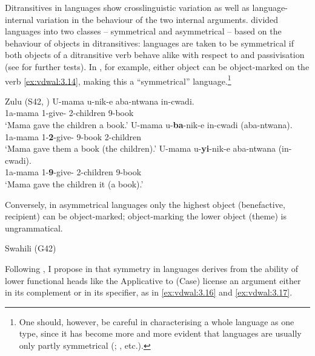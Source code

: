 \documentclass[output=paper]{langsci/langscibook}
\begin{document}
Ditransitives in  languages show crosslinguistic variation as well as
lan\-guage-internal variation in the behaviour of the two internal arguments.
\citet{BresMosh1990} divided  languages into two classes -- symmetrical
and asymmetrical -- based on the behaviour of objects in ditransitives:
languages are taken to be symmetrical if both objects of a ditransitive
verb
behave alike with respect to  and passivisation (see
\citealt{Ngonyani1996,Buell2005} for further tests). In , for
example, either object can be object-marked on the verb \eqref{ex:vdwal:3.14},
making this a \enquote{symmetrical} language.\footnote{One should, however, be careful
    in characterising a whole language as one type, since it has become more
    and more evident that languages are usually only partly symmetrical
    (\citealt{Schadeberg1995,Rugemalira1991,Thwala2006,Ngonyani1996,NgonyaniGithinji2006,Riedel2009,Baker1988,AlsinaMchombo1993,Simango1995,ZellerNgoboka2006,Jerro2015};
, etc.).}

\ea\label{ex:vdwal:3.14}Zulu (S42, \citealt[11]{Adams2010})
	\ea
	\gll	 U-mama  u-nik-e  aba-ntwana   in-cwadi.\\
	    1a-mama  1\Sm{}{}-give-\Pfv{}  2-children  9-book\\
	\glt    ‘Mama gave the children a book.’
	\ex
	\gll	 U-mama  u-\textbf{ba}{}-nik-e  in-cwadi  (aba-ntwana).\\
	    1a-mama  1\Sm{}{}-\textbf{2\Om{}}-give-\Pfv{}  9-book  2-children\\
	\glt    ‘Mama gave them a book (the children).’
	\ex
    \gll U-mama  u-\textbf{yi}{}-nik-e  aba-ntwana   (in-cwadi).\\
    1a-mama  1\Sm{}{}-\textbf{9\Om{}}-give-\Pfv{}  2-children  9-book\\
    \glt ‘Mama gave the children it (a book).’
    \z
\z

Conversely, in asymmetrical languages only the highest object (benefactive,
recipient) can be object-marked; object-marking the lower object (theme) is
ungrammatical.

\ea\label{ex:vdwal:3.15} Swahili (G42)
    \z
\z

Following \textcite{HaddicanHolmberg2012,HaddicanHolmberg2015}, I propose in
\Textcite{vanderWal2017} that symmetry in  languages derives from the
ability of lower functional heads like the Applicative to (Case) license an
argument either in its complement or in its specifier, as in \eqref{ex:vdwal:3.16}
and \eqref{ex:vdwal:3.17}.
\end{document}
